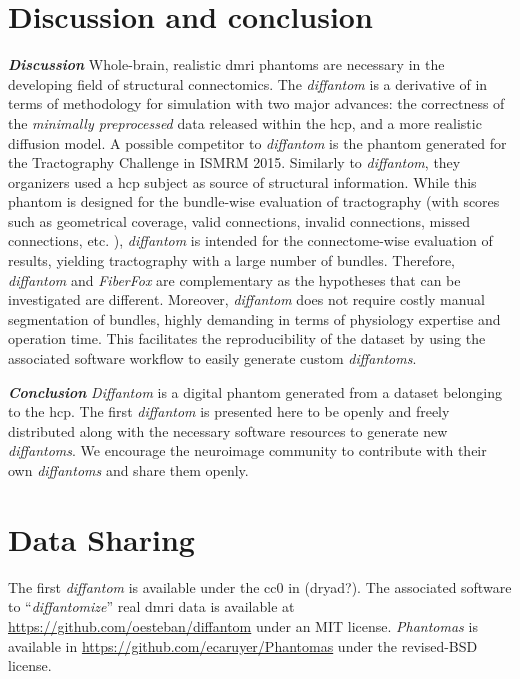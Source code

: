 \documentclass[english]{frontiers/frontiersSCNS} %
\begin{document}
\section*{Discussion and conclusion}
\noindent\textbf{\textit{Discussion\textcolon}}\label{sec:discussion} %
Whole-brain, realistic \gls*{dmri} phantoms are necessary in the developing field of structural
  connectomics.
The \emph{diffantom} is a derivative of \citep{wilkins_fiber_2014} in terms of methodology for
  simulation with two major advances: the correctness of the \emph{minimally preprocessed} data
  \citep{glasser_minimal_2013} released within the \gls*{hcp}, and a more realistic diffusion
  model.
A possible competitor to \emph{diffantom} is the phantom generated for the Tractography Challenge in
  ISMRM 2015.
Similarly to \emph{diffantom}, they organizers used a \gls*{hcp} subject as source of structural information.
While this phantom is designed for the bundle-wise evaluation of tractography (with scores such as geometrical coverage,
  valid connections, invalid connections, missed connections, etc. \citep{cote_tractometer_2013}),
  \emph{diffantom} is intended for the connectome-wise evaluation of results, yielding tractography with
  a large number of bundles.
Therefore, \emph{diffantom} and \emph{FiberFox} are complementary as the hypotheses that can be investigated are different.
Moreover, \emph{diffantom} does not require costly manual segmentation of bundles, highly demanding in terms of physiology
  expertise and operation time.
This facilitates the reproducibility of the dataset by using the associated software workflow to easily
  generate custom \emph{diffantoms}.

\noindent\textbf{\textit{Conclusion\textcolon}}\label{sec:conclusion} %
\emph{Diffantom} is a digital phantom generated from a dataset belonging to the \acrlong*{hcp}.
The first \emph{diffantom} is presented here to be openly and freely distributed along with the necessary
  software resources to generate new \emph{diffantoms}.
We encourage the neuroimage community to contribute with their own \emph{diffantoms} and share them openly.


\section*{Data Sharing}
The first \emph{diffantom} is available under the \gls*{cc0} in {\color{red} (dryad?)}.
The associated software to ``\emph{diffantomize}'' real \gls*{dmri} data is available at \url{https://github.com/oesteban/diffantom}
  under an MIT license.
\emph{Phantomas} is available in \url{https://github.com/ecaruyer/Phantomas} under the revised-BSD license.
\end{document}

